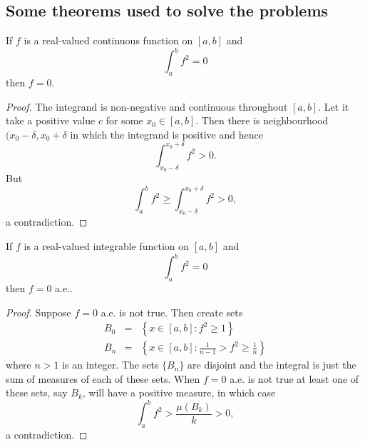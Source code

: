 \subsection{Some theorems used to solve the problems}
\begin{thm}\label{c1s1t2}
If $f$ is a real-valued continuous function on $[a, b]$ and 
\[
\int_a^b f^2 = 0
\]
then $f = 0$.
\end{thm}
\begin{proof}
The integrand is non-negative and continuous throughout $[a, b]$. Let it take 
a positive value $c$ for some $x_0 \in [a, b]$. Then there is neighbourhood
$(x_0 - \delta, x_0 + \delta$ in which the integrand is positive and hence
\[
\int_{x_0 - \delta}^{x_0 + \delta} f^2 > 0.
\]
But
\[
\int_a^b f^2 \ge \int_{x_0 - \delta}^{x_0 + \delta} f^2 > 0,
\]
a contradiction. 
\end{proof}

\begin{thm}\label{c1s1t3}
If $f$ is a real-valued integrable function on $[a, b]$ and 
\[
\int_a^b f^2 = 0
\]
then $f = 0$ a.e..
\end{thm}
\begin{proof}
Suppose $f = 0$ a.e. is not true. Then create sets 
\begin{eqnarray*}
B_0 &=& \left\{x \in [a, b]: f^2 \ge 1\right\} \\
B_n &=& \left\{x \in [a, b] : \frac{1}{n-1} > f^2 \ge \frac{1}{n}\right\}
\end{eqnarray*}
where $n > 1$ is an integer. The sets $\{B_n\}$ are disjoint and the integral is
just the sum of measures of each of these sets. When $f = 0$ a.e. is not true
at least one of these sets, say $B_k$, will have a positive measure, in which
case
\[
\int_a^b f^2 > \frac{\mu(B_k)}{k} > 0,
\]
a contradiction.

\end{proof}
